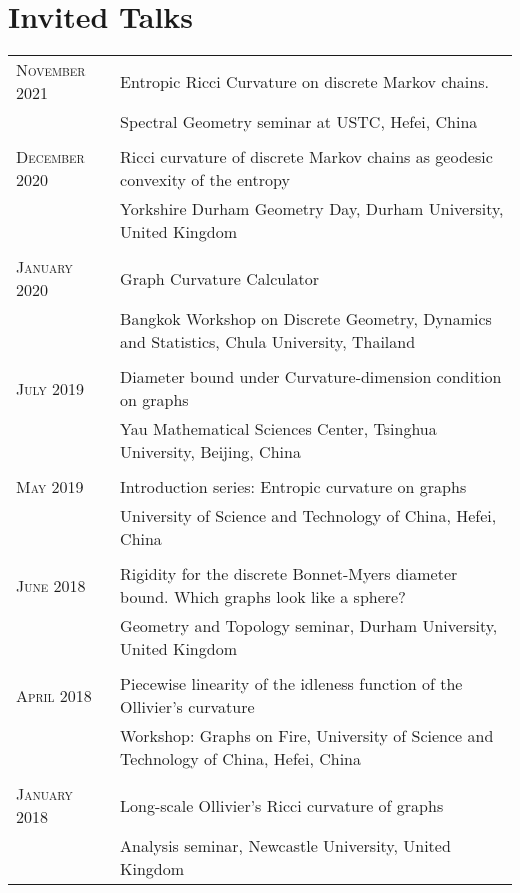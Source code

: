 \documentclass[a4paper,10pt]{article}
\begin{document}
\section{Invited Talks}
\begin{tabular}{p{2.7cm} l}

\textsc{November} 2021	
& Entropic Ricci Curvature on discrete Markov chains.\\
& {\small Spectral Geometry seminar at USTC, Hefei, China} \\&\\	
	
\textsc{December} 2020
& Ricci curvature of discrete Markov chains as geodesic convexity of the entropy\\
& {\small Yorkshire Durham Geometry Day, Durham University, United Kingdom} \\&\\

\textsc{January} 2020
& Graph Curvature Calculator\\
& {\small Bangkok Workshop on Discrete Geometry, Dynamics and Statistics, Chula University, Thailand} \\&\\

\textsc{July} 2019
& Diameter bound under Curvature-dimension condition on graphs\\
& {\small Yau Mathematical Sciences Center, Tsinghua University, Beijing, China} \\&\\

\textsc{May} 2019
& Introduction series: Entropic curvature on graphs\\
& {\small University of Science and Technology of China, Hefei, China}\\&\\

\textsc{June} 2018 
& Rigidity for the discrete Bonnet-Myers diameter bound. Which graphs look like a sphere?\\
& {\small Geometry and Topology seminar, Durham University, United Kingdom}\\&\\

\textsc{April} 2018 
& Piecewise linearity of the idleness function of the Ollivier's curvature\\
& {\small Workshop: Graphs on Fire,  University of Science and Technology of China, Hefei, China}\\&\\

\textsc{January} 2018 
& Long-scale Ollivier's Ricci curvature of graphs\\
& {\small Analysis seminar, Newcastle University, United Kingdom}
\end{tabular}
\end{document}
